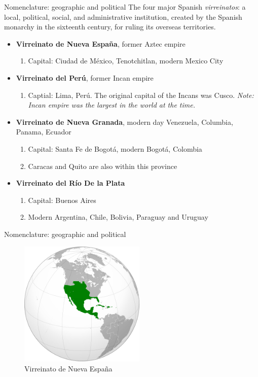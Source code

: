 \documentclass{beamer}
\begin{document}
\begin{frame}{Nomenclature: geographic and political}
\footnotesize
The four major Spanish \textit{virreinatos}: a local, political, social, and administrative institution, created by the Spanish monarchy in the sixteenth century, for ruling its overseas territories.
\begin{itemize}
\footnotesize
\item \textbf{Virreinato de Nueva Espa\~{n}a}, former Aztec empire
\begin{enumerate}
\footnotesize
\item Capital: Ciudad de M\'{e}xico, Tenotchitlan, modern Mexico City
\end{enumerate}
\item \textbf{Virreinato del Per\'{u}}, former Incan empire
\begin{enumerate}
\footnotesize
\item Captial: Lima, Per\'{u}.  The original capital of the Incans was Cusco.  \textit{Note: Incan empire was the largest in the world at the time.}
\end{enumerate}
\item \textbf{Virreinato de Nueva Granada}, modern day Venezuela, Columbia, Panama, Ecuador
\begin{enumerate}
\footnotesize
\item Capital: Santa Fe de Bogot\'{a}, modern Bogot\'{a}, Colombia
\item Caracas and Quito are also within this province
\end{enumerate}
\item \textbf{Virreinato del R\'{i}o De la Plata}
\begin{enumerate}
\footnotesize
\item Capital: Buenos Aires
\item Modern Argentina, Chile, Bolivia, Paraguay and Uruguay
\end{enumerate}
\end{itemize}
\end{frame}

\begin{frame}{Nomenclature: geographic and political}
\begin{figure}
\includegraphics[width=6cm]{figures/vice_nuevaespana.png}
\caption{Virreinato de Nueva Espa\~{n}a}
\end{figure}
\end{frame}
\end{document}
